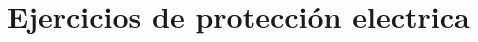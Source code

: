 \documentclass[spanish,openany]{report}
\date{\today}
\begin{document}

%
%
%



\chapter*{Ejercicios de protección electrica}
\end{document}

